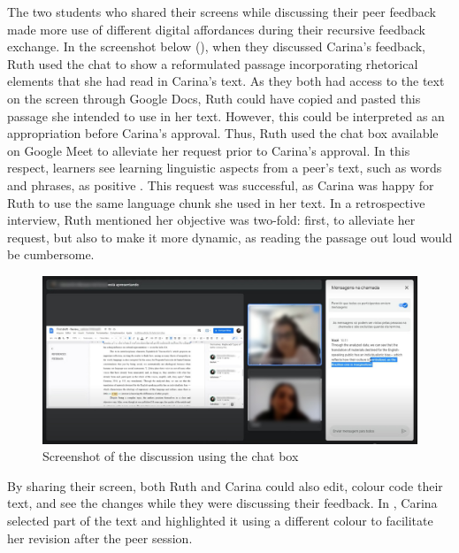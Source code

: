 \documentclass[english]{textolivre}
\begin{document}
The two students who shared their screens while discussing their peer feedback made more use of different digital affordances during their recursive feedback exchange. In the screenshot below (), when they discussed Carina’s feedback, Ruth used the chat to show a reformulated passage incorporating rhetorical elements that she had read in Carina’s text. As they both had access to the text on the screen through Google Docs, Ruth could have copied and pasted this passage she intended to use in her text. However, this could be interpreted as an appropriation before Carina’s approval. Thus, Ruth used the chat box available on Google Meet to alleviate her request prior to Carina’s approval. In this respect, learners see learning linguistic aspects from a peer’s text, such as words and phrases, as positive \cite{zhang2022fostering}. This request was successful, as Carina was happy for Ruth to use the same language chunk she used in her text. In a retrospective interview, Ruth mentioned her objective was two-fold: first, to alleviate her request, but also to make it more dynamic, as reading the passage out loud would be cumbersome.

\begin{figure}[h!]
\centering
\begin{minipage}{.8\textwidth}
 \includegraphics[width=\textwidth]{Fig1.jpeg}
 \caption{Screenshot of the discussion using the chat box}
 \label{fig1}
\end{minipage}
\end{figure}

By sharing their screen, both Ruth and Carina could also edit, colour code their text, and see the changes while they were discussing their feedback. In , Carina selected part of the text and highlighted it using a different colour to facilitate her revision after the peer session.
\end{document}
